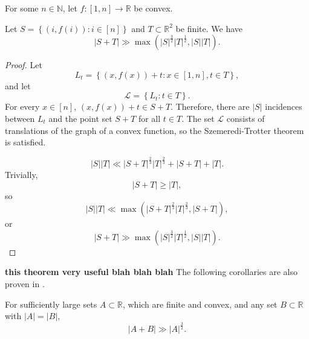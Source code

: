 \documentclass[12pt]{amsart}
\begin{document}
\begin{theorem} \label{thm:translations-of-convex-szt}
For some \(n \in \mathbb{N} \), let \(f : [1,n] \to \mathbb{R} \) be convex.

Let \(S = \left\{ (i,f(i)) : i \in [n] \right\} \) and \(T \subset \mathbb{R} ^{2}\) be finite. We have
\[
    \left\lvert S + T \right\rvert \gg \max \left( \left\lvert S \right\rvert ^{\frac{3}{2} } \left\lvert T \right\rvert ^{\frac{1}{2} } , \left\lvert S \right\rvert \left\lvert T \right\rvert  \right)
.\]
\end{theorem}

\begin{proof}
    Let
    \[
        L_{t} = \left\{ (x,f(x)) + t : x \in [1,n], t \in T \right\} 
    ,\]
    and let
    \[
        \mathcal{L} = \left\{ L_{t} : t \in T \right\} 
    .\]
    For every \(x \in [n]\), \((x,f(x)) + t \in S + T\). Therefore, there are \(\left\lvert S \right\rvert \) incidences
    between \(L_{t} \) and the point set \(S + T\) for all \(t \in T\). The set \(\mathcal{L} \) consists of
    translations of the graph of a convex function, so the Szemeredi-Trotter theorem is satisfied.
    
    \[
        \left\lvert S \right\rvert \left\lvert T \right\rvert \ll \left\lvert S + T \right\rvert ^{\frac{2}{3} } \left\lvert T \right\rvert ^{\frac{2}{3} } + \left\lvert S + T \right\rvert + \left\lvert T \right\rvert 
    .\]
    Trivially,
    \[
        \left\lvert S + T \right\rvert \geq \left\lvert T \right\rvert 
    ,\]
    so
    \[
        \left\lvert S \right\rvert \left\lvert T \right\rvert  \ll\max \left( \left\lvert S + T \right\rvert ^{\frac{2}{3} }\left\lvert T \right\rvert ^{\frac{2}{3} }, \left\lvert S+T \right\rvert  \right) 
    ,\]
    or
    \[
        \left\lvert S + T \right\rvert \gg \max \left( \left\lvert S \right\rvert ^{\frac{3}{2} } \left\lvert T \right\rvert ^{\frac{1}{2} }, \left\lvert S \right\rvert \left\lvert T \right\rvert  \right) 
    .\]
\end{proof}

\textbf{this theorem very useful blah blah blah}
The following corollaries are also proven in \cite{elekes}.

\begin{theorem}
For sufficiently large sets \(A \subset \mathbb{R} \), which are finite and convex, and any set \(B \subset \mathbb{R} \) with \(\left\lvert A \right\rvert = \left\lvert B \right\rvert \),
\[
    \left\lvert A + B \right\rvert \gg \left\lvert A \right\rvert ^{\frac{3}{2} }
.\]
\end{theorem}
\end{document}
